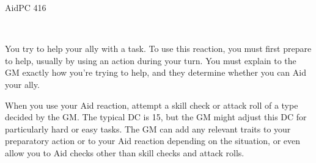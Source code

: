 \documentclass[12pt,openany,twocolumn]{book}
\begin{document}
\begin{action}{Aid}{\reaction{}}{PC 416}
    \begin{actioninfo}
         \\
    \end{actioninfo}

    \begin{actionbody}
        You try to help your ally with a task. To use this reaction, you must first prepare to help, usually by using an action during your turn. You must explain to the GM exactly how you're trying to help, and they determine whether you can Aid your ally.

        When you use your Aid reaction, attempt a skill check or attack roll of a type decided by the GM. The typical DC is 15, but the GM might adjust this DC for particularly hard or easy tasks. The GM can add any relevant traits to your preparatory action or to your Aid reaction depending on the situation, or even allow you to Aid checks other than skill checks and attack rolls.
    \end{actionbody}



\end{action}
\end{document}
